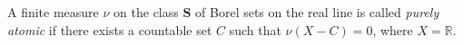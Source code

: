 A finite measure $\nu$ on the class $\mathbf{S}$ of Borel sets on the real line is called \textit{purely atomic} if there exists a countable set $C$ such that $\nu(X - C) = 0$, where $X = \mathbb{R}$.
